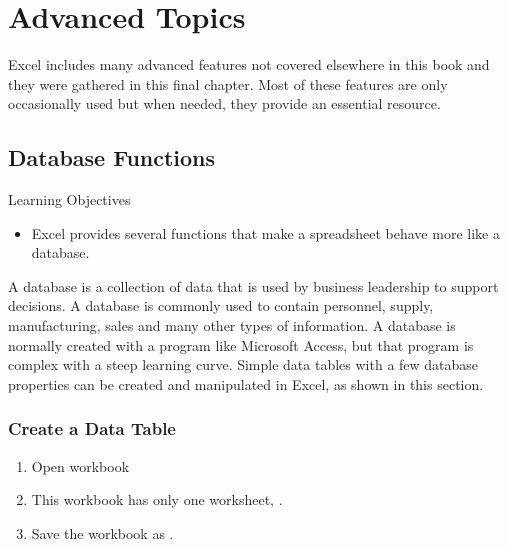 \chapter{Advanced Topics}\label{ch08:topics}


Excel includes many advanced features not covered elsewhere in this book and they were gathered in this final chapter. Most of these features are only occasionally used but when needed, they provide an essential resource.

\section{Database Functions}

\begin{center}
	\begin{objbox}{Learning Objectives}
		\begin{itemize}
			\setlength{\itemsep}{0pt}
			\setlength{\parskip}{0pt}
			\setlength{\parsep}{0pt}
			
			\item Excel provides several functions that make a spreadsheet behave more like a database.
		\end{itemize}
	\end{objbox}
\end{center}

A database is a collection of data that is used by business leadership to support decisions. A database is commonly used to contain personnel, supply, manufacturing, sales and many other types of information. A database is normally created with a program like Microsoft Access, but that program is complex with a steep learning curve. Simple data tables with a few database properties can be created and manipulated in Excel, as shown in this section.

\subsection{Create a Data Table}

\begin{enumerate}
	\item Open workbook 
	\item This workbook has only one worksheet, .
	\item Save the workbook as .
\end{enumerate}

